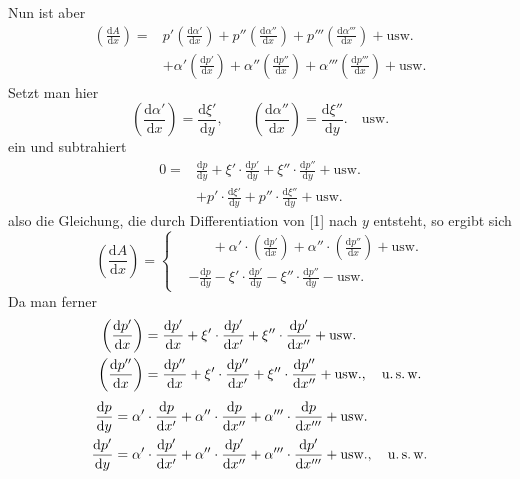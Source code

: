 Nun ist aber
\[
\begin{aligned}
\left(\frac{\mathrm{d}A}{\mathrm{d}x}\right)={}&
p'\left(\frac{\mathrm{d}\alpha'}{\mathrm{d}x}\right)
+p''\left(\frac{\mathrm{d}\alpha''}{\mathrm{d}x}\right)
+p'''\left(\frac{\mathrm{d}\alpha'''}{\mathrm{d}x}\right)+\text{usw.}\\
&+\alpha'\left(\frac{\mathrm{d}p'}{\mathrm{d}x}\right)
+\alpha''\left(\frac{\mathrm{d}p''}{\mathrm{d}x}\right)
+\alpha'''\left(\frac{\mathrm{d}p'''}{\mathrm{d}x}\right)+\text{usw.}
\end{aligned}
\]
Setzt man hier
\[
\left(\frac{\mathrm{d}\alpha'}{\mathrm{d}x}\right)=\frac{\mathrm{d}\xi'}{\mathrm{d}y},\qquad
\left(\frac{\mathrm{d}\alpha''}{\mathrm{d}x}\right)=\frac{\mathrm{d}\xi''}{\mathrm{d}y}.\quad\text{usw.}
\]
ein und subtrahiert
\[
\begin{aligned}
0={}&\frac{\mathrm{d}p}{\mathrm{d}y}
+\xi'\cdot\frac{\mathrm{d}p'}{\mathrm{d}y}
+\xi''\cdot\frac{\mathrm{d}p''}{\mathrm{d}y}+\text{usw.}\\
&+p'\cdot\frac{\mathrm{d}\xi'}{\mathrm{d}y}
+p''\cdot\frac{\mathrm{d}\xi''}{\mathrm{d}y}+\text{usw.}
\end{aligned}
\]
also die Gleichung, die durch Differentiation von [1] nach $y$ entsteht, so ergibt sich
\[
\left(\frac{\mathrm{d}A}{\mathrm{d}x}\right)=
\left\{\begin{aligned}
&\phantom{-\frac{\mathrm{d}p}{\mathrm{d}y}}+\alpha'\cdot\left(\frac{\mathrm{d}p'}{\mathrm{d}x}\right)
+\alpha''\cdot\left(\frac{\mathrm{d}p''}{\mathrm{d}x}\right)+\text{usw.}\\
&-\frac{\mathrm{d}p}{\mathrm{d}y}-\xi'\cdot\frac{\mathrm{d}p'}{\mathrm{d}y}
-\xi''\cdot\frac{\mathrm{d}p''}{\mathrm{d}y}-\text{usw.}
\end{aligned}\right.
\]
Da man ferner
\[
\begin{aligned}
\left(\frac{\mathrm{d}p'}{\mathrm{d}x}\right)&=\frac{\mathrm{d}p'}{\mathrm{d}x}
+\xi'\cdot\frac{\mathrm{d}p'}{\mathrm{d}x'}
+\xi''\cdot\frac{\mathrm{d}p'}{\mathrm{d}x''}+\text{usw.}\\
\left(\frac{\mathrm{d}p''}{\mathrm{d}x}\right)&=\frac{\mathrm{d}p''}{\mathrm{d}x}
+\xi'\cdot\frac{\mathrm{d}p''}{\mathrm{d}x'}
+\xi''\cdot\frac{\mathrm{d}p''}{\mathrm{d}x''}+\text{usw.},\quad\text{u.\,s.\,w.}
\end{aligned}
\]
\[
\begin{aligned}
\frac{\mathrm{d}p}{\mathrm{d}y}&=\alpha'\cdot\frac{\mathrm{d}p}{\mathrm{d}x'}
+\alpha''\cdot\frac{\mathrm{d}p}{\mathrm{d}x''}
+\alpha'''\cdot\frac{\mathrm{d}p}{\mathrm{d}x'''}+\text{usw.}\\
\frac{\mathrm{d}p'}{\mathrm{d}y}&=\alpha'\cdot\frac{\mathrm{d}p'}{\mathrm{d}x'}
+\alpha''\cdot\frac{\mathrm{d}p'}{\mathrm{d}x''}
+\alpha'''\cdot\frac{\mathrm{d}p'}{\mathrm{d}x'''}+\text{usw.},\quad\text{u.\,s.\,w.}
\end{aligned}
\]
